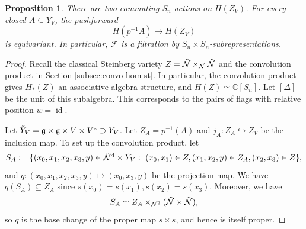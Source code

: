 \documentclass[12pt,a4paper]{article}
\theoremstyle{plain}
\newtheorem{prop}[thm]{Proposition}
\theoremstyle{definition}
\theoremstyle{remark}
\newcommand{\cN}{\mathcal{N}}
\newcommand{\scrF}{\mathscr{F}}
\newcommand{\CC}{\mathbb{C}}
\def\gfrak{\mathfrak{g}}
\begin{document}
    \begin{prop}\label{prop:pushforward-action}
        There are two commuting $S_n$-actions on $H(Z_V)$. For every closed $A\subseteq Y_V$, the pushforward
        \[
        H(p^{-1}A)\longrightarrow H(Z_V)
        \]
        is equivariant. In particular, $\scrF$ is a filtration by $S_n\times S_n$-subrepresentations.
    \end{prop}

    \begin{proof}
        Recall the classical Steinberg variety $Z = \Tilde{\cN} \times_{\cN} \Tilde{\cN}$ and the convolution product in Section \ref{subsec:convo-hom-st}. In particular, the convolution product gives $H_*(Z)$ an associative algebra structure, and $H(Z) \simeq \CC[S_n]$. Let $[\Delta]$ be the unit of this subalgebra. This corresponds to the pairs of flags with relative position $w = \operatorname{id}$.

        Let $\Tilde{Y}_V = \gfrak\times\gfrak\times V\times V^* \supset Y_V$. Let $Z_A = p^{-1}(A)$ and $j_A:Z_A\hookrightarrow Z_V$ be the inclusion map. To set up the convolution product, let
        \[
        S_A:=\{(x_0,x_1,x_2,x_3,y) \in \Tilde{\cN}^4 \times \Tilde{Y}_V:\ (x_0,x_1)\in Z, (x_1,x_2,y)\in Z_A, (x_2,x_3)\in Z\},
        \]
        and $q:(x_0,x_1,x_2,x_3,y) \mapsto (x_0,x_3,y)$ be the projection map. We have $q(S_A) \subseteq Z_A$ since $s(x_0)=s(x_1), s(x_2)=s(x_3)$. Moreover, we have
        \[
        S_A\simeq Z_A\times_{\cN^2}(\Tilde{\cN}\times \Tilde{\cN}),
        \]
        so $q$ is the base change of the proper map $s\times s$, and hence is itself proper.
        

\end{proof}
\end{document}
